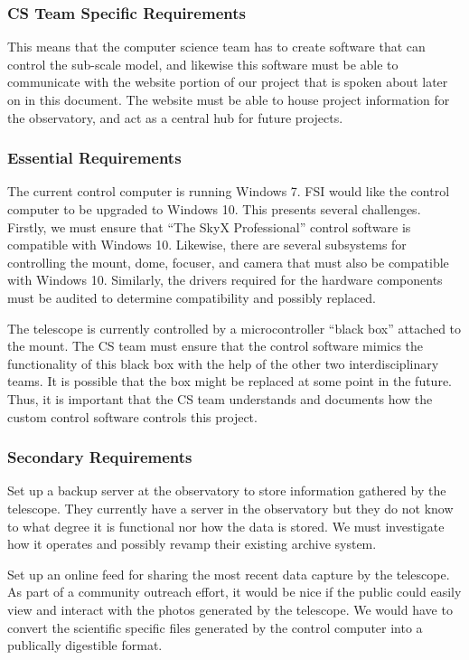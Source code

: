 \documentclass[12pt]{article}
\begin{document}
\subsubsection{CS Team Specific Requirements}

This means that the computer science team has to create software that can control the sub-scale model, and likewise this software must be able to communicate with the website portion of our project that is spoken about later on in this document. The website must be able to house project information for the observatory, and act as a central hub for future projects. 

\subsubsection{Essential Requirements}

The current control computer is running Windows 7. FSI would like the control computer to be upgraded to Windows 10. This presents several challenges. Firstly, we must ensure that “The SkyX Professional” control software is compatible with Windows 10. Likewise, there are several subsystems for controlling the mount, dome, focuser, and camera that must also be compatible with Windows 10. Similarly, the drivers required for the hardware components must be audited to determine compatibility and possibly replaced.

The telescope is currently controlled by a microcontroller “black box” attached to the mount. The CS team must ensure that the control software mimics the functionality of this black box with the help of the other two interdisciplinary teams. It is possible that the box might be replaced at some point in the future. Thus, it is important that the CS team understands and documents how the custom control software controls this project. 

\subsubsection{Secondary Requirements}

Set up a backup server at the observatory to store information gathered by the telescope. They currently have a server in the observatory but they do not know to what degree it is functional nor how the data is stored. We must investigate how it operates and possibly revamp their existing archive system.

Set up an online feed for sharing the most recent data capture by the telescope. As part of a community outreach effort, it would be nice if the public could easily view and interact with the photos generated by the telescope. We would have to convert the scientific specific files generated by the control computer into a publically digestible format.
\end{document}

